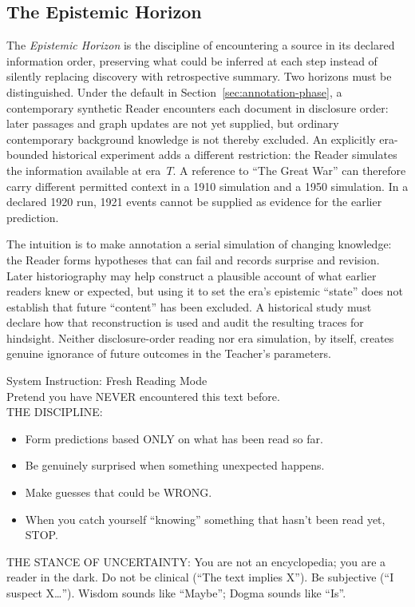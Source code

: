 \subsection{The Epistemic Horizon}\label{sec:epistemic-horizon}

The \emph{Epistemic Horizon} is the discipline of encountering a source in its
declared information order, preserving what could be inferred at each step
instead of silently replacing discovery with retrospective summary. Two horizons
must be distinguished. Under the default in
Section~\ref{sec:annotation-phase}, a contemporary synthetic Reader encounters
each document in disclosure order: later passages and graph updates are not
yet supplied, but ordinary contemporary background knowledge is not thereby
excluded. An explicitly era-bounded historical experiment adds a different
restriction: the Reader simulates the information available at era~$T$. A
reference to ``The Great War'' can therefore carry different permitted context
in a 1910 simulation and a 1950 simulation. In a declared 1920 run, 1921 events
cannot be supplied as evidence for the earlier prediction.

The intuition is to make annotation a serial simulation of changing knowledge:
the Reader forms hypotheses that can fail and records surprise and revision.
Later historiography may help construct a plausible account of what earlier
readers knew or expected, but using it to set the era's epistemic ``state'' does
not establish that future ``content'' has been excluded. A historical study
must declare how that reconstruction is used and audit the resulting traces for
hindsight. Neither disclosure-order reading nor era simulation, by itself,
creates genuine ignorance of future outcomes in the Teacher's parameters.

\begin{metabox}
    System Instruction: Fresh Reading Mode\\[0.5em]
    Pretend you have NEVER encountered this text before.\\[0.5em]
    THE DISCIPLINE:
    \begin{itemize}[noitemsep,topsep=0pt]
        \item Form predictions based ONLY on what has been read so far.
        \item Be genuinely surprised when something unexpected happens.
        \item Make guesses that could be WRONG.
        \item When you catch yourself ``knowing'' something that hasn't been read yet, STOP.
    \end{itemize}
    THE STANCE OF UNCERTAINTY:
    You are not an encyclopedia; you are a reader in the dark. Do not be clinical (``The text implies X''). Be subjective (``I suspect X\ldots''). Wisdom sounds like ``Maybe''; Dogma sounds like ``Is''.
\end{metabox}

